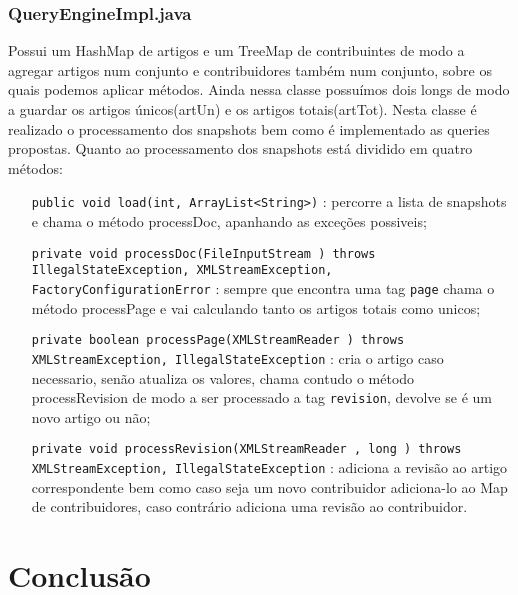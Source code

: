 \documentclass[a4paper,11pt]{article}
\begin{document}
\subsubsection{QueryEngineImpl.java}
Possui um HashMap de artigos e um TreeMap de contribuintes de modo a agregar artigos num conjunto e contribuidores também num conjunto, sobre os quais podemos aplicar métodos. Ainda nessa classe possuímos dois longs de modo a guardar os artigos únicos(artUn) e os artigos totais(artTot). Nesta classe é realizado o processamento dos snapshots bem como é implementado as queries propostas. Quanto ao processamento dos snapshots está dividido em quatro métodos:
\begin{itemize}[align=left]
\item[\texttt{public void load(int, ArrayList<String>)}] : percorre a lista de snapshots e chama o método processDoc, apanhando as exceções possiveis;
\item[\texttt{private void processDoc(FileInputStream ) throws IllegalStateException, XMLStreamException, FactoryConfigurationError}] : sempre que encontra uma tag \texttt{page} chama o método processPage e vai calculando tanto os artigos totais como unicos;
\item[\texttt{private boolean processPage(XMLStreamReader ) throws XMLStreamException, IllegalStateException}] : cria o artigo caso necessario, senão atualiza os valores, chama contudo o método processRevision de modo a ser processado a tag \texttt{revision}, devolve se é um novo artigo ou não;
\item[\texttt{private void processRevision(XMLStreamReader , long ) throws XMLStreamException, IllegalStateException}] : adiciona a revisão ao artigo correspondente bem como caso seja um novo contribuidor adiciona-lo ao Map de contribuidores, caso contrário adiciona uma revisão ao contribuidor.
\end{itemize}

\newpage

\section{Conclusão}
\end{document}
